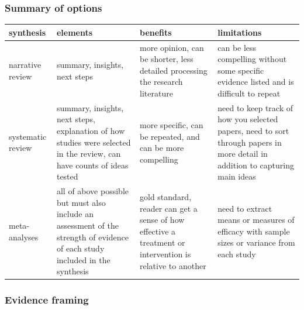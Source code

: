 \documentclass[
]{book}
\begin{document}
\hypertarget{summary-of-options}{%
\subsubsection*{Summary of options}\label{summary-of-options}}

\begin{tabular}{llll}
\toprule
synthesis & elements & benefits & limitations\\
\midrule
narrative review & summary, insights, next steps & more opinion, can be shorter, less detailed processing the research literature & can be less compelling without some specific evidence listed and is difficult to repeat\\
systematic review & summary, insights, next steps, explanation of how studies were selected in the review, can have counts of ideas tested & more specific, can be repeated, and can be more compelling & need to keep track of how you selected papers, need to sort through papers in more detail in addition to capturing main ideas\\
meta-analyses & all of above possible but must also include an assessment of the strength of evidence of each study included in the synthesis & gold standard, reader can get a sense of how effective a treatment or intervention is relative to another & need to extract means or measures of efficacy with sample sizes or variance from each study\\
\bottomrule
\end{tabular}

\hypertarget{evidence-framing}{%
\subsubsection*{Evidence framing}\label{evidence-framing}}
\end{document}
